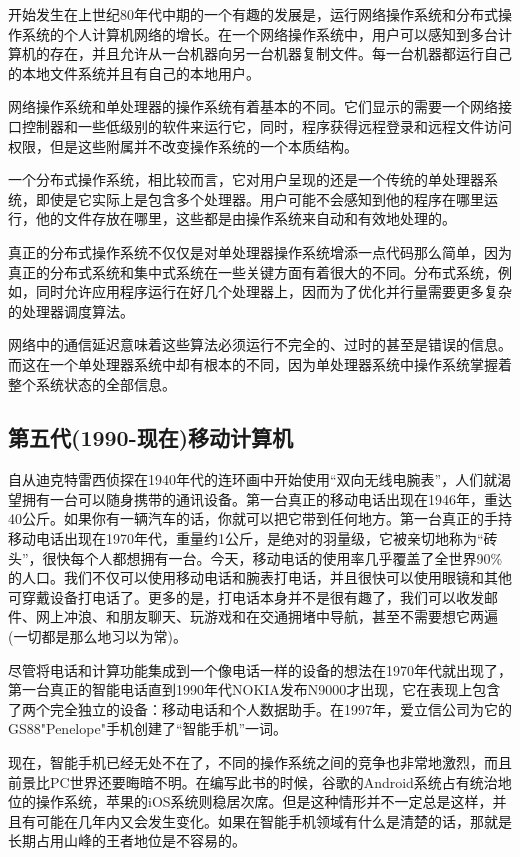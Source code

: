 	开始发生在上世纪80年代中期的一个有趣的发展是，运行网络操作系统和分布式操作系统的个人计算机网络的增长。在一个网络操作系统中，用户可以感知到多台计算机的存在，并且允许从一台机器向另一台机器复制文件。每一台机器都运行自己的本地文件系统并且有自己的本地用户。
	
	网络操作系统和单处理器的操作系统有着基本的不同。它们显示的需要一个网络接口控制器和一些低级别的软件来运行它，同时，程序获得远程登录和远程文件访问权限，但是这些附属并不改变操作系统的一个本质结构。
	
	一个分布式操作系统，相比较而言，它对用户呈现的还是一个传统的单处理器系统，即使是它实际上是包含多个处理器。用户可能不会感知到他的程序在哪里运行，他的文件存放在哪里，这些都是由操作系统来自动和有效地处理的。
	
	真正的分布式操作系统不仅仅是对单处理器操作系统增添一点代码那么简单，因为真正的分布式系统和集中式系统在一些关键方面有着很大的不同。分布式系统，例如，同时允许应用程序运行在好几个处理器上，因而为了优化并行量需要更多复杂的处理器调度算法。
	
	网络中的通信延迟意味着这些算法必须运行不完全的、过时的甚至是错误的信息。而这在一个单处理器系统中却有根本的不同，因为单处理器系统中操作系统掌握着整个系统状态的全部信息。
	
\subsection{第五代(1990-现在)移动计算机}

	自从迪克特雷西侦探在1940年代的连环画中开始使用“双向无线电腕表”，人们就渴望拥有一台可以随身携带的通讯设备。第一台真正的移动电话出现在1946年，重达40公斤。如果你有一辆汽车的话，你就可以把它带到任何地方。第一台真正的手持移动电话出现在1970年代，重量约1公斤，是绝对的羽量级，它被亲切地称为“砖头”，很快每个人都想拥有一台。今天，移动电话的使用率几乎覆盖了全世界90\%的人口。我们不仅可以使用移动电话和腕表打电话，并且很快可以使用眼镜和其他可穿戴设备打电话了。更多的是，打电话本身并不是很有趣了，我们可以收发邮件、网上冲浪、和朋友聊天、玩游戏和在交通拥堵中导航，甚至不需要想它两遍(一切都是那么地习以为常)。
	
	尽管将电话和计算功能集成到一个像电话一样的设备的想法在1970年代就出现了，第一台真正的智能电话直到1990年代NOKIA发布N9000才出现，它在表现上包含了两个完全独立的设备：移动电话和个人数据助手。在1997年，爱立信公司为它的GS88"Penelope"手机创建了“智能手机”一词。
	
	现在，智能手机已经无处不在了，不同的操作系统之间的竞争也非常地激烈，而且前景比PC世界还要晦暗不明。在编写此书的时候，谷歌的Android系统占有统治地位的操作系统，苹果的iOS系统则稳居次席。但是这种情形并不一定总是这样，并且有可能在几年内又会发生变化。如果在智能手机领域有什么是清楚的话，那就是长期占用山峰的王者地位是不容易的。
	
